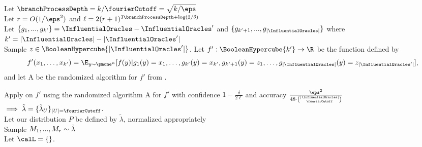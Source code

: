 \begin{algorithm}[H]
\DontPrintSemicolon
  
  Let $\branchProcessDepth = k/\fourierCutoff = \sqrt{k/\eps}$\\
  Let $r = O(1/\eps^2)$ and $\ell = 2(r+1)^{3\branchProcessDepth+\log(2/\delta)}$\\ 
%
   {
  }
Let $\{g_1,...,g_{k'}\} = \InfluentialOracles - \InfluentialOracles'$ and $\{g_{k'+1},...,g_{|\InfluentialOracles|}\}$ where $k' = |\InfluentialOracles| - |\InfluentialOracles'|$\\
Sample $z \in \BooleanHypercube{|\InfluentialOracles'|}$. Let $f': \BooleanHypercube{k'}\to \R$ be the function defined by 
$$f'(x_1, \ldots, x_{k'}) = \E_{y\sim \pmone^n}
[f(y) | g_1(y)=x_1, \ldots, g_{k'}(y) = x_{k'}, g_{k'+1}(y) = z_1, \ldots, g_{|\InfluentialOracles|}(y)=z_{|\InfluentialOracles'|}], $$ 
and let A be the randomized algorithm for $f'$ from .

 Apply  on $f'$ using the randomized algorithm A for $f'$ with confidence $1 - \frac{\delta}{2\ell}$ and accuracy $\frac{\eps^2}{48\cdot \binom{|\InfluentialOracles|}{\fourierCutoff}}$ $\implies \tilde{\lambda}=\{\tilde{\lambda}_U\}_{|U| = \fourierCutoff}$. \\
 Let our distribution $P$ be defined by $\tilde{\lambda}$, normalized appropriately\\
 Sample $M_1,...,M_r \sim \Tilde{\lambda}$ \label{line:sampling}\\

Let $\calL = \{\}$.\\
 \Return{$\calL$}
  
\caption{Branching Process}
\label{alg:phase-one-branch}
\end{algorithm}



